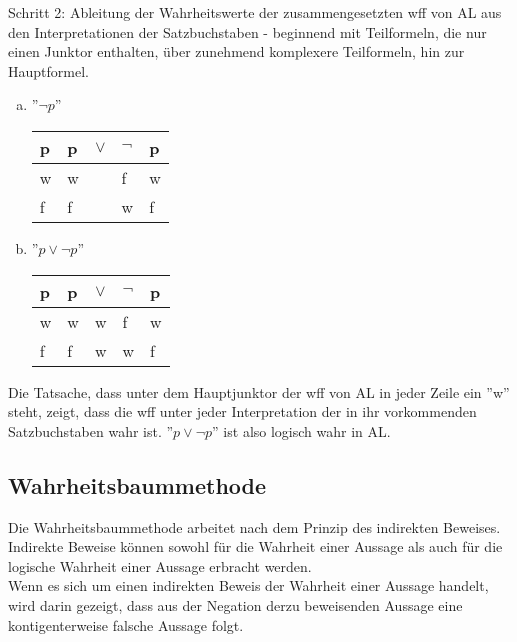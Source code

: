 \documentclass{scrartcl}
\begin{document}
Schritt 2: Ableitung der Wahrheitswerte der zusammengesetzten wff von AL aus den Interpretationen der Satzbuchstaben - beginnend mit Teilformeln, die nur einen Junktor enthalten, über zunehmend komplexere Teilformeln, hin zur Hauptformel. \\

\begin{enumerate}[a)]
	\item ''$ \neg p $'' \\
	\begin{tabular}{|l|l l l l|}
		\hline
		p & p & $ \vee $ & $ \neg $ & p \\
		\hline
		w & w & & f & w \\
		\hline
		f & f & & w & f \\
		\hline
	\end{tabular} 
	\item ''$ p \vee \neg p $'' \\
		\begin{tabular}{|l|l l l l|}
			\hline
			p & p & $ \vee $ & $ \neg $ & p \\
			\hline
			w & w & \cellcolor{gray!25}w & f & w \\
			\hline
			f & f & \cellcolor{gray!25}w & w & f \\
			\hline
		\end{tabular} 
\end{enumerate}

Die Tatsache, dass unter dem Hauptjunktor der wff von AL in jeder Zeile ein ''w'' steht, zeigt, dass die wff unter jeder Interpretation der in ihr vorkommenden Satzbuchstaben wahr ist. ''$ p \vee \neg p $'' ist also logisch wahr in AL.

\subsection{Wahrheitsbaummethode}

Die Wahrheitsbaummethode arbeitet nach dem Prinzip des indirekten Beweises. \\

Indirekte Beweise können sowohl für die Wahrheit einer Aussage als auch für die logische Wahrheit einer Aussage erbracht werden. \\

Wenn es sich um einen indirekten Beweis der Wahrheit einer Aussage handelt, wird darin gezeigt, dass aus der Negation derzu beweisenden Aussage eine kontigenterweise falsche Aussage folgt. \\
\end{document}
